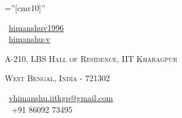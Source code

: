 \documentclass[a4paper,10pt]{extarticle} %
\begin{document}
\pagestyle{empty} %

\font\fb=''[cmr10]'' %



\begin{enumerate}
\begin{minipage}{0.2\linewidth}
 \normalsize \faGithub\ {\href{https://github.com/himanshuv1996}{himanshuv1996}}\\
 \normalsize  \faLinkedinSquare\ {\href{https://www.linkedin.com/in/himanshu-v}{himanshu-v}}
 \end{minipage}
 \begin{minipage}{0.5\linewidth}
  \normalsize\par{\par} %
 \par{\centering\normalsize {\textsc{A-210, LBS Hall of Residence, IIT Kharagpur}}\hfill\par}
  \par{\centering\normalsize {\textsc{West Bengal, India - 721302}}\hfill\par}
 \end{minipage}
 \begin{minipage}{0.3\linewidth}
\normalsize \faEnvelope\ {\href{mailto:vhimanshu.iitkgp@gmail.com}{vhimanshu.iitkgp@gmail.com}}\\
\normalsize \faPhone\ {  +91 86092 73495}
\end{minipage}
 \end{enumerate}




\end{document}
